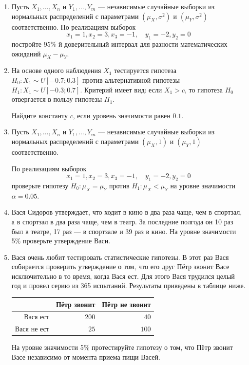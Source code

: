 \begin{enumerate}
\item Пусть $X_{1}, \ldots, X_{n}$ и $Y_{1}, \ldots, Y_{m}$ —
независимые случайные выборки из нормальных распределений с параметрами
$(\mu_{X},\sigma^2)$ и $(\mu_{Y},\sigma^2)$ соответственно.
По реализациям выборок
\[
x_{1} = 1,  x_{2} = 3, x_{3} = -1, \quad
y_{1} = -2,  y_{2} = 0
\]
постройте 95\%-й доверительный интервал для разности математических ожиданий
$\mu_{X} - \mu_{Y}$.

\item На основе одного наблюдения $X_{1}$
тестируется гипотеза $H_{0} : X_{1} \sim U[-0.7;0.3]$ против альтернативной гипотезы
$H_{1}: X_{1} \sim U[-0.3;0.7]$.
Критерий имеет вид: если $X_{1} > c$,
то гипотеза $H_{0}$ отвергается в пользу гипотезы $H_{1}$.

Найдите константу $c$, если уровень значимости равен $0.1$.

\item  Пусть $X_{1}, \ldots, X_{n}$ и $Y_{1}, \ldots, Y_{m}$ —
независимые случайные выборки из нормальных распределений
с параметрами $(\mu_{X}, 1)$ и $(\mu_{Y}, 1)$ соответственно.

По реализациям выборок
\[
x_{1} = 1,  x_{2} = 3, x_{3} = -1, \quad
y_{1} = -2,  y_{2} = 0
\]
проверьте гипотезу $H_{0}:\mu_{X} = \mu_{Y}$ против $H_{1}:\mu_{X} < \mu_{Y}$ на уровне значимости $\alpha = 0.05$.


\item  Вася Сидоров утверждает, что ходит в кино в два раза чаще, чем в спортзал,
а в спортзал в два раза чаще, чем в театр.
За последние полгода он 10 раз был в театре, 17 раз — в спортзале и 39 раз в кино.
На уровне значимости 5\% проверьте утверждение Васи.

\item Вася очень любит тестировать статистические гипотезы.
В этот раз Вася собирается проверить утверждение о том,
что его друг Пётр звонит Васе исключительно в то время, когда Вася ест.
Для этого Вася трудился целый год и провел серию из 365 испытаний.
Результаты приведены в таблице ниже.

\begin{center}\begin{tabular}{rrr}
\toprule
	& Пётр звонит   & Пётр не звонит  \\ \midrule
Вася ест           & $200$ & $40$ \\
	Вася не ест       & $25$ & $100$  \\ \bottomrule
\end{tabular}\end{center}

На уровне значимости 5\% протестируйте гипотезу о том, что Пётр звонит Васе
независимо от момента приема пищи Васей.


\end{enumerate}
	
